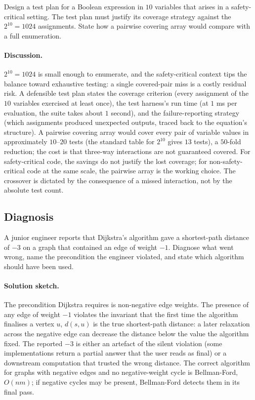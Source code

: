 \begin{exercise}
Design a test plan for a Boolean expression in $10$ variables that
arises in a safety-critical setting. The test plan must justify
its coverage strategy against the $2^{10} = 1024$ assignments. State
how a pairwise covering array would compare with a full enumeration.
\end{exercise}

\paragraph{Discussion.}
$2^{10} = 1024$ is small enough to enumerate, and the safety-critical
context tips the balance toward exhaustive testing: a single
covered-pair miss is a costly residual risk. A defensible test plan
states the coverage criterion (every assignment of the $10$
variables exercised at least once), the test harness's run time
(at $1$ ms per evaluation, the suite takes about $1$ second), and
the failure-reporting strategy (which assignments produced
unexpected outputs, traced back to the equation's structure). A
pairwise covering array would cover every pair of variable values
in approximately $10$--$20$ tests (the standard table for $2^{10}$
gives $13$ tests), a $50$-fold reduction; the cost is that
three-way interactions are not guaranteed covered. For
safety-critical code, the savings do not justify the lost coverage;
for non-safety-critical code at the same scale, the pairwise array
is the working choice. The crossover is dictated by the
consequence of a missed interaction, not by the absolute test count.

\subsection*{Diagnosis}

\begin{exercise}
A junior engineer reports that Dijkstra's algorithm gave a
shortest-path distance of $-3$ on a graph that contained an edge of
weight $-1$. Diagnose what went wrong, name the precondition the
engineer violated, and state which algorithm should have been used.
\end{exercise}

\paragraph{Solution sketch.}
The precondition Dijkstra requires is non-negative edge weights.
The presence of any edge of weight $-1$ violates the invariant that
the first time the algorithm finalises a vertex $u$, $d(s, u)$ is
the true shortest-path distance: a later relaxation across the
negative edge can decrease the distance below the value the
algorithm fixed. The reported $-3$ is either an artefact of the
silent violation (some implementations return a partial answer
that the user reads as final) or a downstream computation that
trusted the wrong distance. The correct algorithm for graphs with
negative edges and no negative-weight cycle is Bellman-Ford,
$O(nm)$; if negative cycles may be present, Bellman-Ford detects
them in its final pass.

